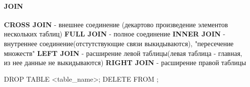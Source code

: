 \documentclass[a5paper,10pt]{article}
\begin{document}
			\paragraph{JOIN}
				\textbf{CROSS JOIN}	- внешнее соединение (декартово произведение элементов нескольких таблиц)
				\textbf{FULL JOIN} - полное соединение
				\textbf{INNER JOIN} - внутреннее соединение(отстутствующие связи выкидываются), "пересечение множеств"
				\textbf{LEFT JOIN} - расширение левой таблицы(левая таблица - главная, из нее данные не выкидываются)
				\textbf{RIGHT JOIN} - расширение правой таблицы

			\begin{lstlistening}
				DROP TABLE <table_name>;
				DELETE FROM ;
			\end{lstlistening}
\end{document}
